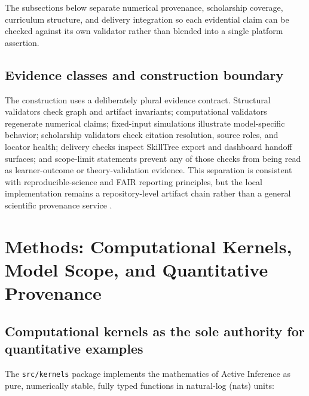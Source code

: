 \documentclass[
  english,
]{article}
\begin{document}
The subsections below separate numerical provenance, scholarship
coverage, curriculum structure, and delivery integration so each
evidential claim can be checked against its own validator rather than
blended into a single platform assertion.

\subsection{Evidence classes and construction
boundary}\label{evidence-classes-and-construction-boundary}

The construction uses a deliberately plural evidence contract.
Structural validators check graph and artifact invariants; computational
validators regenerate numerical claims; fixed-input simulations
illustrate model-specific behavior; scholarship validators check
citation resolution, source roles, and locator health; delivery checks
inspect SkillTree export and dashboard handoff surfaces; and scope-limit
statements prevent any of those checks from being read as
learner-outcome or theory-validation evidence. This separation is
consistent with reproducible-science and FAIR reporting principles, but
the local implementation remains a repository-level artifact chain
rather than a general scientific provenance service
\citep{munafo2017reproducible_science, wilkinson2016fair}.

\newpage

\section{Methods: Computational Kernels, Model Scope, and Quantitative
Provenance}\label{sec:methodology-kernels-provenance}

\subsection{Computational kernels as the sole authority for quantitative
examples}\label{computational-kernels-as-the-sole-authority-for-quantitative-examples}

The \texttt{src/kernels} package implements the mathematics of Active
Inference as pure, numerically stable, fully typed functions in
natural-log (nats) units:
\end{document}
